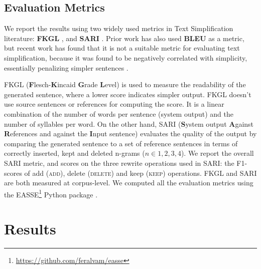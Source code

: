 \documentclass[11pt,a4paper]{article}
\begin{document}
\subsection{Evaluation Metrics}
We report the results using two widely used metrics in Text Simplification literature: 
\textbf{FKGL} \cite{kincaid1975derivation}, and \textbf{SARI} \cite{xu2016optimizing}. Prior work has also used \textbf{BLEU} \cite{papineni-etal-2002-bleu} as a metric, but recent work has found that it is not a suitable metric for evaluating text simplification, because it was found to be negatively correlated with simplicity, 
essentially penalizing simpler sentences \cite{sulem-etal-2018-bleu}.

FKGL (\textbf{F}lesch-\textbf{K}incaid \textbf{G}rade \textbf{L}evel) is used to measure the readability of the generated sentence, where a lower score indicates simpler output. FKGL doesn't use source sentences or references for computing the score. It is a linear combination of the number of words per sentence (system output) and the number of syllables per word. On the other hand, SARI (\textbf{S}ystem output \textbf{A}gainst \textbf{R}eferences and against the \textbf{I}nput sentence) evaluates the quality of the output by comparing the generated sentence to a set of reference sentences in terms of correctly inserted, kept and deleted n-grams ($n\in{1, 2, 3, 4}$). 
We report the overall SARI metric, and scores on the three rewrite operations used in SARI: the F1-scores of add (\textsc{add}), delete (\textsc{delete}) and keep (\textsc{keep}) operations. 
FKGL and SARI are both measured at corpus-level. 
We computed all the evaluation metrics using the EASSE\footnote{\url{https://github.com/feralvam/easse}} Python package \cite{alva2019easse}. 



\section{Results}
\end{document}
